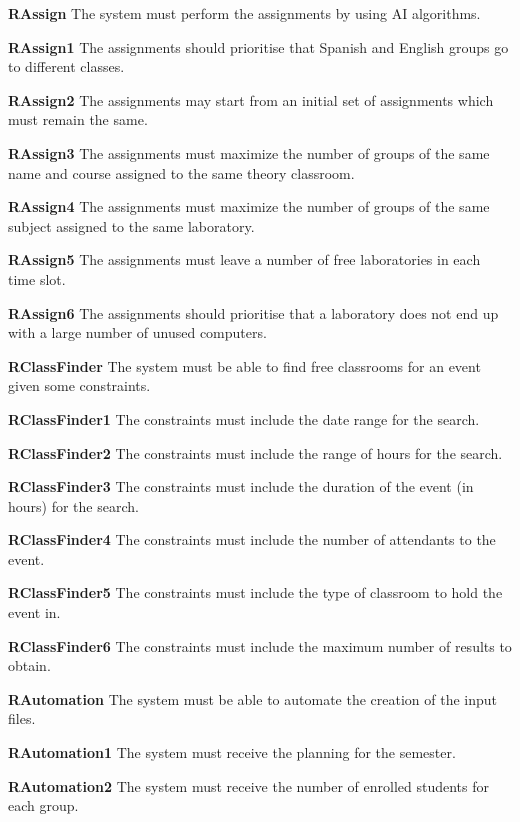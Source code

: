 \begin{description}
    \item \textbf{RAssign} The system must perform the assignments by using AI algorithms.
        \begin{description}
            \item \textbf{RAssign1} The assignments should prioritise that Spanish and English groups go to different classes. 
            \item \textbf{RAssign2} The assignments may start from an initial set of assignments which must remain the same.
            \item \textbf{RAssign3} The assignments must maximize the number of groups of the same name and course assigned to the same theory classroom.
            \item \textbf{RAssign4} The assignments must maximize the number of groups of the same subject assigned to the same laboratory.
            \item \textbf{RAssign5} The assignments must leave a number of free laboratories in each time slot.
            \item \textbf{RAssign6} The assignments should prioritise that a laboratory does not end up with a large number of unused computers.
        \end{description}

    \item \textbf{RClassFinder} The system must be able to find free classrooms for an event given some constraints.
        \begin{description}
            \item \textbf{RClassFinder1} The constraints must include the date range for the search.
            \item \textbf{RClassFinder2} The constraints must include the range of hours for the search. 
            \item \textbf{RClassFinder3} The constraints must include the duration of the event (in hours) for the search.
            \item \textbf{RClassFinder4} The constraints must include the number of attendants to the event. 
            \item \textbf{RClassFinder5} The constraints must include the type of classroom to hold the event in. 
            \item \textbf{RClassFinder6} The constraints must include the maximum number of results to obtain. 
        \end{description}

    \item \textbf{RAutomation} The system must be able to automate the creation of the input files.
        \begin{description}
            \item \textbf{RAutomation1} The system must receive the planning for the semester.
            \item \textbf{RAutomation2} The system must receive the number of enrolled students for each group.
        \end{description}


\end{description}
